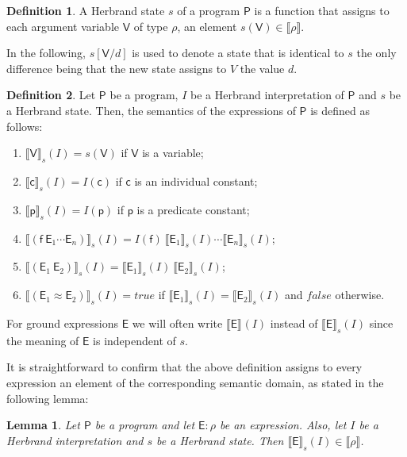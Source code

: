 \documentclass[submission,copyright]{eptcs}
\newtheorem{lemma}{Lemma}
\theoremstyle{definition}
\newtheorem{definition}{Definition}
\newcommand{\mo}[1]{\llbracket#1\rrbracket}
\newcommand{\mwrs}[3]{\llbracket#1\rrbracket_{#3}(#2)}
\begin{document}
\begin{definition}
  A Herbrand state $s$ of a program $\mathsf{P}$ is a function that assigns to each argument variable $\mathsf{V}$
  of type $\rho$, an element $s(\mathsf{V}) \in \mo{\rho}$.
\end{definition}
In the following, $s[\mathsf{V}/d]$ is used to denote a state that is identical to $s$ the
only difference being that the new state assigns to $V$ the value $d$.

\begin{definition}
  Let $\mathsf{P}$ be a program, $I$ be a Herbrand interpretation of $\mathsf{P}$ and
  $s$ be a Herbrand state. Then, the semantics of the expressions of $\mathsf{P}$ is
  defined as follows:
\begin{enumerate}
  \item $\mwrs{\mathsf{V}}{I}{s} = s(\mathsf{V})$ if $\mathsf{V}$ is a variable;
  \item $\mwrs{\mathsf{c}}{I}{s} = I(\mathsf{c})$ if $\mathsf{c}$ is an individual constant;
  \item $\mwrs{\mathsf{p}}{I}{s} = I(\mathsf{p})$ if $\mathsf{p}$ is a predicate constant;
  \item $\mwrs{(\mathsf{f}\ \mathsf{E}_1\cdots \mathsf{E}_n)}{I}{s} = I(\mathsf{f})\ \mwrs{\mathsf{E}_1}{I}{s}\cdots \mwrs{\mathsf{E}_n}{I}{s}$;
  \item $\mwrs{(\mathsf{E}_1\ \mathsf{E}_2)}{I}{s} = \mwrs{\mathsf{E}_1}{I}{s}\ \mwrs{\mathsf{E}_2}{I}{s}$;
  \item $\mwrs{(\mathsf{E}_1\approx \mathsf{E}_2)}{I}{s} = true$ if $\mwrs{\mathsf{E}_1}{I}{s}= \mwrs{\mathsf{E}_2}{I}{s}$ and $\mathit{false}$ otherwise.
\end{enumerate}
\end{definition}
For ground expressions $\mathsf{E}$ we will often write $\mwrs{\mathsf{E}}{I}{}$ instead
of $\mwrs{\mathsf{E}}{I}{s}$ since the meaning of $\mathsf{E}$ is independent of $s$.

It is straightforward to confirm that the above definition assigns to every expression an element of the corresponding semantic domain, as stated in the following lemma:
\begin{lemma}
Let $\mathsf{P}$ be a program and let $\mathsf{E} : \rho$ be an expression. Also, let $I$ be a Herbrand interpretation and $s$ be a Herbrand state. Then $\mwrs{\mathsf{E}}{I}{s}\in\mo{\rho}$.
\end{lemma}
\end{document}
